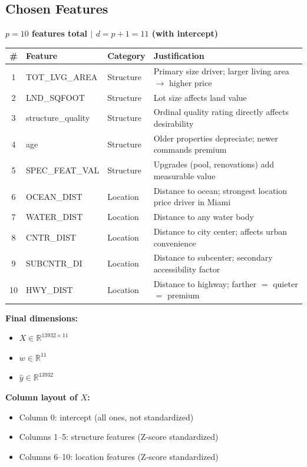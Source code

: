 \documentclass[11pt]{article}
\begin{document}
\subsection*{Chosen Features}

\textbf{$p = 10$ features total $\mid$ $d = p + 1 = 11$ (with intercept)}

\begin{center}
\begin{tabular}{c l l p{6cm}}
\toprule
\# & Feature & Category & Justification \\
\midrule
1  & TOT\_LVG\_AREA   & Structure & Primary size driver; larger living area $\to$ higher price \\
2  & LND\_SQFOOT      & Structure & Lot size affects land value \\
3  & structure\_quality & Structure & Ordinal quality rating directly affects desirability \\
4  & age              & Structure & Older properties depreciate; newer commands premium \\
5  & SPEC\_FEAT\_VAL  & Structure & Upgrades (pool, renovations) add measurable value \\
6  & OCEAN\_DIST      & Location  & Distance to ocean; strongest location price driver in Miami \\
7  & WATER\_DIST      & Location  & Distance to any water body \\
8  & CNTR\_DIST       & Location  & Distance to city center; affects urban convenience \\
9  & SUBCNTR\_DI      & Location  & Distance to subcenter; secondary accessibility factor \\
10 & HWY\_DIST        & Location  & Distance to highway; farther $=$ quieter $=$ premium \\
\bottomrule
\end{tabular}
\end{center}

\textbf{Final dimensions:}
\begin{itemize}
    \item $X \in \mathbb{R}^{13932 \times 11}$
    \item $w \in \mathbb{R}^{11}$
    \item $\hat{y} \in \mathbb{R}^{13932}$
\end{itemize}

\textbf{Column layout of $X$:}
\begin{itemize}
    \item Column 0: intercept (all ones, not standardized)
    \item Columns 1--5: structure features (Z-score standardized)
    \item Columns 6--10: location features (Z-score standardized)
\end{itemize}
\end{document}
